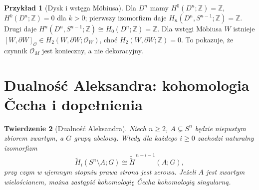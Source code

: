 \documentclass[11pt,a4paper,oneside]{report}
\newcommand{\Z}{\mathbb{Z}}
\theoremstyle{plain}
\newtheorem{twierdzenie}{Twierdzenie}[section]
\theoremstyle{definition}
\newtheorem{przyklad}[twierdzenie]{Przykład}
\theoremstyle{remark}
\begin{document}
\begin{przyklad}[Dysk i wstęga Möbiusa]
Dla $D^n$ mamy
$H^0(D^n;\Z)=\Z$, $H^k(D^n;\Z)=0$ dla $k>0$;
pierwszy izomorfizm daje
$H_n(D^n,S^{n-1};\Z)=\Z$. Drugi daje
$H^n(D^n,S^{n-1};\Z)\cong H_0(D^n;\Z)=\Z$.
Dla wstęgi Möbiusa $W$ istnieje
$[W,\partial W]_{\mathcal O}\in H_2(W,\partial W;\mathcal O_W)$,
choć $H_2(W,\partial W;\Z)=0$. To pokazuje, że czynnik
$\mathcal O_M$ jest konieczny, a nie dekoracyjny.
\end{przyklad}

\section{Dualność Aleksandra: kohomologia \v{C}echa i dopełnienia}
\label{sec:alexander-v4}
\begin{twierdzenie}[Dualność Aleksandra]
\label{thm:alexander-v4}
Niech $n\ge2$, $A\subsetneq S^n$ będzie niepustym zbiorem
zwartym, a $G$ grupą abelową. Wtedy dla każdego $i\ge0$
zachodzi naturalny izomorfizm
\[
\widetilde H_i(S^n\setminus A;G)
\cong\widetilde{\check H}^{\,n-i-1}(A;G),
\]
przy czym w ujemnym stopniu prawa strona jest zerowa.
Jeżeli $A$ jest zwartym wielościanem, można zastąpić
kohomologię \v{C}echa kohomologią singularną.
\end{twierdzenie}
\end{document}
